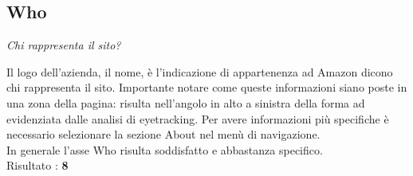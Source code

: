 \subsection{Who}
\begin{center}

\textit{Chi rappresenta il sito?}

Il logo dell'azienda, il nome, è l'indicazione di appartenenza ad Amazon 
dicono chi rappresenta il sito. Importante notare come queste 
informazioni siano poste in una zona  della pagina: risulta 
nell'angolo in alto a sinistra della forma ad  evidenziata 
dalle analisi di eyetracking. Per avere informazioni più specifiche
è necessario selezionare la sezione About nel menù di navigazione. \\
In generale l'asse Who risulta soddisfatto e abbastanza specifico. \\
Risultato : \textbf{8}

\end{center}